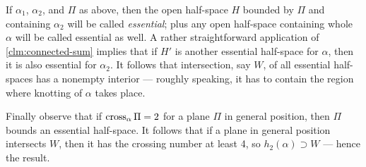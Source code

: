 If $\alpha_1$, $\alpha_2$, and $\Pi$ as above, then the open half-space $H$ bounded by $\Pi$ and containing $\alpha_2$ will be called \emph{essential};
plus any open half-space containing whole $\alpha$ will be called essential as well.
A rather straightforward application of \ref{clm:connected-sum} implies that if $H'$ is another essential half-space for $\alpha$, then it is also essential for $\alpha_2$.
It follows that intersection, say $W$, of all essential half-spaces has a nonempty interior --- roughly speaking, it has to contain the region where knotting of $\alpha$ takes place.

Finally observe that if $\mathop{\rm cross}\nolimits_\alpha\Pi=2$ for a plane $\Pi$ in general position, then $\Pi$ bounds an essential half-space. 
It follows that if a plane in general position intersects $W$, then it has the crossing number at least 4,
so $h_2(\alpha)\supset W$ --- hence the result.
\qeds
